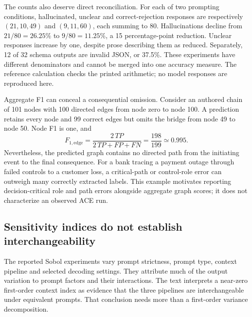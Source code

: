The counts also deserve direct reconciliation. For each of two prompting conditions, hallucinated, unclear and correct-rejection responses are respectively $(21,10,49)$ and $(9,11,60)$, each summing to 80. Hallucinations decline from $21/80=26.25\%$ to $9/80=11.25\%$, a 15 percentage-point reduction. Unclear responses increase by one, despite prose describing them as reduced. Separately, 12 of 32 schema outputs are invalid JSON, or 37.5\%. These experiments have different denominators and cannot be merged into one accuracy measure. The reference calculation checks the printed arithmetic; no model responses are reproduced here.~\citep{exec21_ace,exec21_ace_reference}

Aggregate F1 can conceal a consequential omission. Consider an authored chain of 101 nodes with 100 directed edges from node zero to node 100. A prediction retains every node and 99 correct edges but omits the bridge from node 49 to node 50. Node F1 is one, and
\begin{equation}
 F_{1,\mathrm{edge}}=\frac{2\,TP}{2\,TP+FP+FN}
 =\frac{198}{199}\simeq0.995.
 \label{exec21:ace-path}
\end{equation}
Nevertheless, the predicted graph contains no directed path from the initiating event to the final consequence. For a bank tracing a payment outage through failed controls to a customer loss, a critical-path or control-role error can outweigh many correctly extracted labels. This example motivates reporting decision-critical role and path errors alongside aggregate graph scores; it does not characterize an observed ACE run.~\citep{exec21_ace_reference}

\subsection{Sensitivity indices do not establish interchangeability}
\label{exec21:ace-sensitivity}
The reported Sobol experiments vary prompt strictness, prompt type, context pipeline and selected decoding settings. They attribute much of the output variation to prompt factors and their interactions. The text interprets a near-zero first-order context index as evidence that the three pipelines are interchangeable under equivalent prompts. That conclusion needs more than a first-order variance decomposition.~\citep{exec21_ace}

